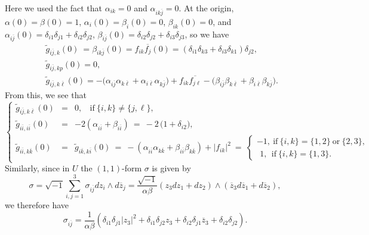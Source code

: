 \documentclass{amsart}
\numberwithin{equation}{section}
\theoremstyle{definition}
\renewcommand{\1}{\mathds{1}}
\renewcommand{\>}{\rightarrow}
\begin{document}
Here we used the fact that $\alpha_{ik}=0$ and $\alpha_{ik\overline{j}} =0$. At the origin, $\alpha (0)=\beta (0)=1$, $\alpha_i(0)=\beta_i(0)=0$, $\beta_{ik}(0)=0$, and $\alpha_{i\overline{j}}(0)= \delta_{i1}\delta_{j1}+ \delta_{i2}\delta_{j2}$, $\beta_{i\overline{j}}(0)=  \delta_{i2}\delta_{j2}+ \delta_{i3}\delta_{j3}$, so we have
\begin{eqnarray}
&&  \tilde{g}_{i\overline{j},k}(0) \ = \beta_{ik\overline{j}}(0) =f_{ik}\overline{f_j}(0)= (\delta_{i1}\delta_{k3}+\delta_{i3}\delta_{k1})\delta_{j2} , \label{eq:8.6} \\
 && \tilde{g}_{i\overline{j},kp}(0) = 0, \label{eq:8.7} \\
 && \tilde{g}_{i\overline{j},k\overline{\ell}}(0) = - \big(\alpha_{i\overline{j}} \alpha_{k\overline{\ell}} + \alpha_{i\overline{\ell}} \alpha_{k\overline{j}} \big)  + f_{ik}\overline{ f_{j\ell} } - \big(\beta_{i\overline{j}} \beta_{k\overline{\ell}} + \beta_{i\overline{\ell}} \beta_{k\overline{j}} \big). \label{eq:8.8}
\end{eqnarray}
From this, we see that
\begin{equation} \label{eq:8.9}
\left\{ \begin{array}{llll}  \tilde{g}_{i\overline{j},k\overline{\ell}}(0)  & = & 0 , \ \ \ \ \mbox{if} \ \{ i,k\} \neq \{ j,\ell\},  \\ \tilde{g}_{i\overline{i},i\overline{i}}(0) &  =  &  -2 (\alpha_{i\overline{i}} + \beta_{i\overline{i}} )  \ = \ - 2\,\big( 1+ \delta_{i2}\big), \\
 \tilde{g}_{i\overline{i},k\overline{k}}(0)  & = &  \tilde{g}_{i\overline{k},k\overline{i}}(0)  \ = \ -(\alpha_{i\overline{i}}\alpha_{k\overline{k}} + \beta_{i\overline{i}}\beta_{k\overline{k}}) + |f_{ik}|^2 \ = \  \left\{ \begin{array}{ll} -1, \ \mbox{if} \ \{ i,k\} = \{ 1,2\} \ \mbox{or} \ \{ 2,3\} , \\ \ \,1, \ \ \mbox{if} \ \{ i,k\} = \{ 1,3\} .\end{array} \right.
 \end{array}  \right.
\end{equation}
Similarly, since in $U$ the $(1,1)$-form $\sigma$ is given by
$$ \sigma = \sqrt{-1}\sum_{i,j=1}^3 \sigma_{i\overline{j}} dz_i \wedge d\overline{z}_j = \frac{\sqrt{-1} }{\alpha \beta } (z_3dz_1+dz_2) \wedge (\overline{z}_3 d\overline{z}_1 + d\overline{z}_2),
$$
we therefore  have
 \begin{equation*}
 \sigma_{i\overline{j}} = \frac{1}{\alpha \beta} ( \delta_{i1}\delta_{j1} |z_3|^2 + \delta_{i1}\delta_{j2} z_3 + \delta_{i2}\delta_{j1}\overline{z}_3 + \delta_{i2}\delta_{j2}).
\end{equation*}
\end{document}
